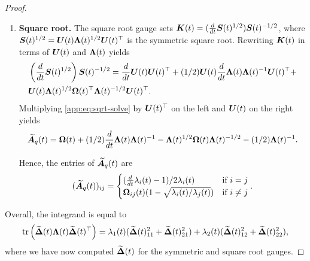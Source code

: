 \begin{proof}
\begin{enumerate}[label=(\alph*)]
    Hence, the entries of $\widetilde{\mbA}_q(t)$ are
    \begin{equation}\label{app:eqn:eigen-symm}
        (\widetilde{\mbA}_q(t))_{ij} = \begin{cases}
            (\frac{d}{dt}\lambda_i(t) - 1)/(2 \lambda_i(t)) & \text{if $i = j$}\\
            \mbOmega_{ij}(t) (\lambda_j(t) - \lambda_i(t)) / (\lambda_i(t) + \lambda_j(t)) & \text{if $i \neq j$}
        \end{cases}.
    \end{equation}
    \item \textbf{Square root.}
    The square root gauge sets $\boldsymbol{K}(t) = (\frac{d}{dt}\boldsymbol{S}(t)^{1/2})\boldsymbol{S}(t)^{-1/2}$, where $\boldsymbol{S}(t)^{1/2} = \boldsymbol{U}(t) \boldsymbol{\Lambda}(t)^{1/2}\boldsymbol{U}(t)^\top$ is the symmetric square root. Rewriting $\boldsymbol{K}(t)$ in terms of $\boldsymbol{U}(t)$ and $\boldsymbol{\Lambda}(t)$ yields
    \begin{equation}\label{app:eq:sqrt-solve}
    \begin{aligned}
        &\left(\frac{d}{dt}\boldsymbol{S}(t)^{1/2} \right)\boldsymbol{S}(t)^{-1/2}  = \frac{d}{dt} \boldsymbol{U}(t) \boldsymbol{U}(t)^\top  + (1/2)\boldsymbol{U}(t) \frac{d}{dt}\boldsymbol{\Lambda}(t)\boldsymbol{\Lambda}(t)^{-1}\boldsymbol{U}(t)^\top +\\
        &\boldsymbol{U}(t)\boldsymbol{\Lambda}(t)^{1/2}\boldsymbol{\Omega}(t)^\top\boldsymbol{\Lambda}(t)^{-1/2}\boldsymbol{U}(t)^\top.
    \end{aligned}
    \end{equation}
    Multiplying \cref{app:eq:sqrt-solve} by $\boldsymbol{U}(t)^\top$ on the left and $\boldsymbol{U}(t)$ on the right yields 
    \begin{equation*}
        \widetilde{\boldsymbol{A}}_q(t) = \boldsymbol{\Omega}(t) + (1/2) \frac{d}{dt}\boldsymbol{\Lambda}(t)\boldsymbol{\Lambda}(t)^{-1} - \boldsymbol{\Lambda}(t)^{1/2}\boldsymbol{\Omega}(t) \boldsymbol{\Lambda}(t)^{-1/2} - (1/2)\boldsymbol{\Lambda}(t)^{-1}.
    \end{equation*}

      Hence, the entries of $\widetilde{\mbA}_q(t)$ are
    \begin{equation}\label{app:eqn:eigen-sqrt}
        (\widetilde{\boldsymbol{A}}_q(t))_{ij} = \begin{cases}
            (\frac{d}{dt}\lambda_i(t) - 1) / 2\lambda_i(t) & \text{if $i = j$}\\
            \boldsymbol{\Omega}_{ij}(t)(1 - \sqrt{\lambda_i(t) / \lambda_j(t)}) & \text{if $i \neq j$}
        \end{cases}.
    \end{equation}
\end{enumerate}


Overall, the integrand is equal to
\begin{equation}\label{app:eqn:integrand}
    \mathrm{tr}\left(
        \widetilde{\boldsymbol{\Delta}}(t)\boldsymbol{\Lambda}(t)\widetilde{\boldsymbol{\Delta}}(t)^\top
    \right) = \lambda_1(t)(\widetilde{\boldsymbol{\Delta}}(t)_{11}^2 + \widetilde{\boldsymbol{\Delta}}(t)_{21}^2) + \lambda_2(t)(\widetilde{\boldsymbol{\Delta}}(t)_{12}^2 + \widetilde{\boldsymbol{\Delta}}(t)_{22}^2),
\end{equation}
where we have now computed $\widetilde{\boldsymbol{\Delta}}(t)$ for the symmetric and square root gauges.


\end{proof}
